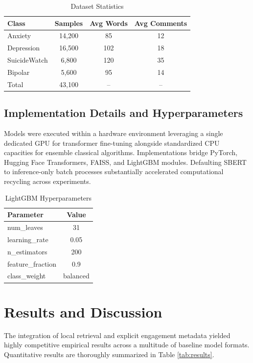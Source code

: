 \documentclass[11pt]{article}
\begin{document}
\begin{table}[H]
\centering
\caption{Dataset Statistics}
\begin{tabular}{lccc}
\toprule
Class & Samples & Avg Words & Avg Comments \\
\midrule
Anxiety & 14,200 & 85 & 12 \\
Depression & 16,500 & 102 & 18 \\
SuicideWatch & 6,800 & 120 & 35 \\
Bipolar & 5,600 & 95 & 14 \\
\midrule
Total & 43,100 & -- & -- \\
\bottomrule
\end{tabular}
\label{tab:dataset}
\end{table}

\subsection{Implementation Details and Hyperparameters}

Models were executed within a hardware environment leveraging a single dedicated GPU for transformer fine-tuning alongside standardized CPU capacities for ensemble classical algorithms. Implementations bridge PyTorch, Hugging Face Transformers, FAISS, and LightGBM modules. Defaulting SBERT to inference-only batch processes substantially accelerated computational recycling across experiments.

\begin{table}[H]
\centering
\caption{LightGBM Hyperparameters}
\begin{tabular}{lc}
\toprule
Parameter & Value \\
\midrule
num\_leaves & 31 \\
learning\_rate & 0.05 \\
n\_estimators & 200 \\
feature\_fraction & 0.9 \\
class\_weight & balanced \\
\bottomrule
\end{tabular}
\label{tab:hyperparams}
\end{table}

\section{Results and Discussion}

The integration of local retrieval and explicit engagement metadata yielded highly competitive empirical results across a multitude of baseline model formats. Quantitative results are thoroughly summarized in Table \ref{tab:results}.
\end{document}
